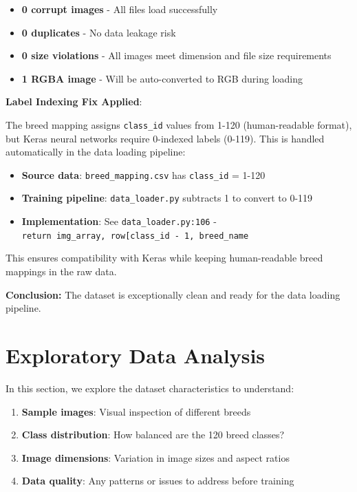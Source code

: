 \documentclass[
  letterpaper,
  DIV=11,
  numbers=noendperiod]{scrartcl}
\providecommand{\tightlist}{%
  \setlength{\itemsep}{0pt}\setlength{\parskip}{0pt}}
\begin{document}
\begin{itemize}
\tightlist
\item
  \textbf{0 corrupt images} - All files load successfully
\item
  \textbf{0 duplicates} - No data leakage risk\\
\item
  \textbf{0 size violations} - All images meet dimension and file size
  requirements
\item
  \textbf{1 RGBA image} - Will be auto-converted to RGB during loading
\end{itemize}

\textbf{Label Indexing Fix Applied}:

The breed mapping assigns \texttt{class\_id} values from 1-120
(human-readable format), but Keras neural networks require 0-indexed
labels (0-119). This is handled automatically in the data loading
pipeline:

\begin{itemize}
\tightlist
\item
  \textbf{Source data}: \texttt{breed\_mapping.csv} has
  \texttt{class\_id} = 1-120
\item
  \textbf{Training pipeline}: \texttt{data\_loader.py} subtracts 1 to
  convert to 0-119
\item
  \textbf{Implementation}: See \texttt{data\_loader.py:106} -
  \texttt{return\ img\_array,\ row{[}\textquotesingle{}class\_id\textquotesingle{}{]}\ -\ 1,\ breed\_name}
\end{itemize}

This ensures compatibility with Keras while keeping human-readable breed
mappings in the raw data.

\textbf{Conclusion:} The dataset is exceptionally clean and ready for
the data loading pipeline.

\section{Exploratory Data Analysis}\label{exploratory-data-analysis}

In this section, we explore the dataset characteristics to understand:

\begin{enumerate}
\def\labelenumi{\arabic{enumi}.}
\tightlist
\item
  \textbf{Sample images}: Visual inspection of different breeds
\item
  \textbf{Class distribution}: How balanced are the 120 breed classes?
\item
  \textbf{Image dimensions}: Variation in image sizes and aspect ratios
\item
  \textbf{Data quality}: Any patterns or issues to address before
  training
\end{enumerate}
\end{document}
